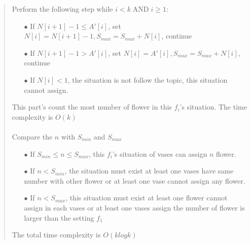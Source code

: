\documentclass{article}
\DeclareMathOperator{\AND}{AND}
\begin{document}
\begin{Question}
\begin{Subquestion}
\begin{answer}
\begin{quote}
    Perform the following step while $ i < k \AND i \geq 1 $:
    \begin{itemize}
        \item[$\bullet$] If $N[i+1] - 1 \leq A'[i]$, set $N[i]= N[i+1] - 1, S_{max} = S_{max} + N[i]$, continue
        \item[$\bullet$] If $N[i+1] - 1 > A'[i]$, set $N[i]= A'[i], S_{max} = S_{max} + N[i]$, continue
        \item[$\bullet$] If $N[i] < 1$, the situation is not follow the topic, this situation cannot assign.
    \end{itemize}
    This part's count the most number of flower in this $f_i$'s situation. The time complexity is $O(k)$\\\\
    Compare the $n$ with $S_{min}$ and $S_{max}$
    \begin{itemize}
        \item[$\bullet$] If $S_{min} \leq n \leq S_{max}$, this $f_i$'s situation of vases can assign $n$ flower.
        \item[$\bullet$] If $n < S_{min}$, the situation must exist at least one vases have same number with other flower or at least one vase cannot assign any flower.
        \item[$\bullet$] If $n < S_{max}$, this situation must exist at least one flower cannot assign in each vases or at least one vases assign the number of flower is larger than the setting $f_1$
    \end{itemize}
    The total time complexity is $O(klogk)$\\
\end{quote}
\end{answer}
\end{Subquestion}
\end{Question}
\end{document}
